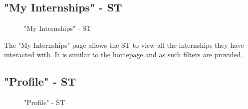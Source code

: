\subsection{"My Internships" - ST}
\label{subsec:my-internships-st}%

\begin{figure}[H]
    \centering
    \caption{"My Internships" - ST}
    \label{fig:my-internships-st}
\end{figure}

\par The "My Internships" page allows the ST to view all the internships they have interacted with. It is similar to
the homepage and as such filters are provided.

\subsection{"Profile" - ST}
\label{subsec:profile-st}%

\begin{figure}[H]
    \centering
    \caption{"Profile" - ST}
    \label{fig:profile-st}
\end{figure}

